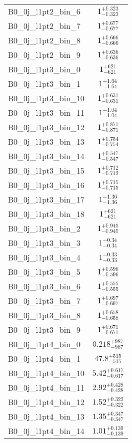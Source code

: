 \begin{tabular}{|l|c|}
B0\_0j\_l1pt2\_bin\_6 & $1^{+0.323}_{-0.323}$ \\
B0\_0j\_l1pt2\_bin\_7 & $1^{+0.677}_{-0.677}$ \\
B0\_0j\_l1pt2\_bin\_8 & $1^{+0.666}_{-0.666}$ \\
B0\_0j\_l1pt2\_bin\_9 & $1^{+0.636}_{-0.636}$ \\
B0\_0j\_l1pt3\_bin\_0 & $1^{+621}_{-621}$ \\
B0\_0j\_l1pt3\_bin\_1 & $1^{+1.64}_{-1.64}$ \\
B0\_0j\_l1pt3\_bin\_10 & $1^{+0.631}_{-0.631}$ \\
B0\_0j\_l1pt3\_bin\_11 & $1^{+1.04}_{-1.04}$ \\
B0\_0j\_l1pt3\_bin\_12 & $1^{+0.871}_{-0.871}$ \\
B0\_0j\_l1pt3\_bin\_13 & $1^{+0.754}_{-0.754}$ \\
B0\_0j\_l1pt3\_bin\_14 & $1^{+0.547}_{-0.547}$ \\
B0\_0j\_l1pt3\_bin\_15 & $1^{+0.712}_{-0.712}$ \\
B0\_0j\_l1pt3\_bin\_16 & $1^{+0.715}_{-0.715}$ \\
B0\_0j\_l1pt3\_bin\_17 & $1^{+1.36}_{-1.36}$ \\
B0\_0j\_l1pt3\_bin\_18 & $1^{+621}_{-621}$ \\
B0\_0j\_l1pt3\_bin\_2 & $1^{+0.945}_{-0.945}$ \\
B0\_0j\_l1pt3\_bin\_3 & $1^{+0.34}_{-0.34}$ \\
B0\_0j\_l1pt3\_bin\_4 & $1^{+0.33}_{-0.33}$ \\
B0\_0j\_l1pt3\_bin\_5 & $1^{+0.596}_{-0.596}$ \\
B0\_0j\_l1pt3\_bin\_6 & $1^{+0.555}_{-0.555}$ \\
B0\_0j\_l1pt3\_bin\_7 & $1^{+0.697}_{-0.697}$ \\
B0\_0j\_l1pt3\_bin\_8 & $1^{+0.658}_{-0.658}$ \\
B0\_0j\_l1pt3\_bin\_9 & $1^{+0.671}_{-0.671}$ \\
B0\_0j\_l1pt4\_bin\_0 & $0.218^{+987}_{-987}$ \\
B0\_0j\_l1pt4\_bin\_1 & $47.8^{+515}_{-515}$ \\
B0\_0j\_l1pt4\_bin\_10 & $5.42^{+0.617}_{-0.617}$ \\
B0\_0j\_l1pt4\_bin\_11 & $2.92^{+0.428}_{-0.428}$ \\
B0\_0j\_l1pt4\_bin\_12 & $1.52^{+0.322}_{-0.322}$ \\
B0\_0j\_l1pt4\_bin\_13 & $1.35^{+0.347}_{-0.347}$ \\
B0\_0j\_l1pt4\_bin\_14 & $1.01^{+0.139}_{-0.139}$ \\

\end{tabular}
